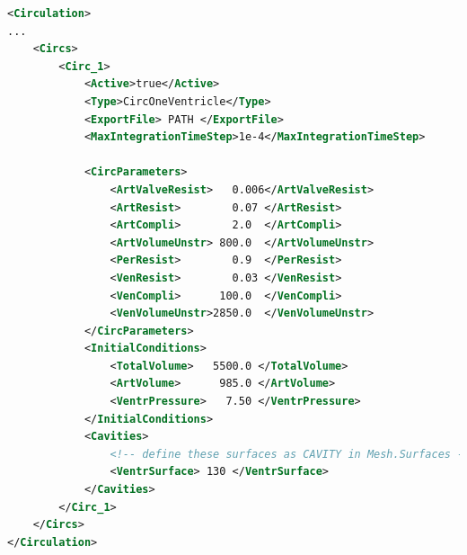 \begin{lstlisting}[language=XML,caption=.xml settings for the 1-chamber circulation model]
<Circulation>
...
    <Circs>
        <Circ_1>
            <Active>true</Active>
            <Type>CircOneVentricle</Type>
            <ExportFile> PATH </ExportFile>
            <MaxIntegrationTimeStep>1e-4</MaxIntegrationTimeStep>
            
            <CircParameters>
                <ArtValveResist>   0.006</ArtValveResist>
                <ArtResist>        0.07 </ArtResist>
                <ArtCompli>        2.0  </ArtCompli>
                <ArtVolumeUnstr> 800.0  </ArtVolumeUnstr>
                <PerResist>        0.9  </PerResist>
                <VenResist>        0.03 </VenResist>
                <VenCompli>      100.0  </VenCompli>
                <VenVolumeUnstr>2850.0  </VenVolumeUnstr>
            </CircParameters>
            <InitialConditions>
                <TotalVolume>   5500.0 </TotalVolume>
                <ArtVolume>      985.0 </ArtVolume>
                <VentrPressure>   7.50 </VentrPressure>
            </InitialConditions>
            <Cavities>
                <!-- define these surfaces as CAVITY in Mesh.Surfaces -->
                <VentrSurface> 130 </VentrSurface>
            </Cavities>
        </Circ_1>
    </Circs>
</Circulation>
\end{lstlisting}

